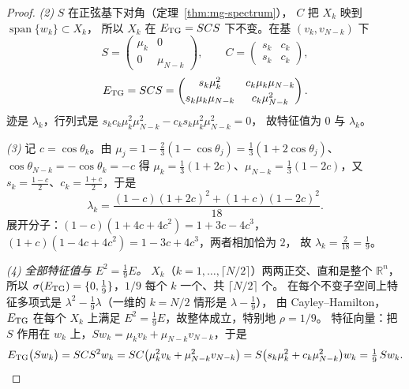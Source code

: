 \begin{proof}
\emph{(2)} $S$ 在正弦基下对角（定理~\ref{thm:mg-spectrum}），
$C$ 把 $X_k$ 映到 $\operatorname{span}\{w_k\}\subset X_k$，
所以 $X_k$ 在 $E_{\rm TG}=SCS$ 下不变。在基 $(v_k,v_{N-k})$ 下
\begin{equation}
  S=\begin{pmatrix}\mu_k&0\\0&\mu_{N-k}\end{pmatrix},\qquad
  C=\begin{pmatrix}s_k&c_k\\ s_k&c_k\end{pmatrix},
\end{equation}
\begin{equation}
  E_{\rm TG}=SCS=\begin{pmatrix}
    s_k\mu_k^2 & c_k\mu_k\mu_{N-k}\\[2pt]
    s_k\mu_k\mu_{N-k} & c_k\mu_{N-k}^2
  \end{pmatrix}.
\end{equation}
迹是 $\lambda_k$，行列式是 $s_kc_k\mu_k^2\mu_{N-k}^2-c_ks_k\mu_k^2\mu_{N-k}^2=0$，
故特征值为 $0$ 与 $\lambda_k$。

\emph{(3)} 记 $c=\cos\theta_k$。由 $\mu_j=1-\frac23(1-\cos\theta_j)=\frac13(1+2\cos\theta_j)$、
$\cos\theta_{N-k}=-\cos\theta_k=-c$ 得
$\mu_k=\frac13(1+2c)$、$\mu_{N-k}=\frac13(1-2c)$，又 $s_k=\frac{1-c}{2}$、$c_k=\frac{1+c}{2}$，于是
\begin{equation}
  \lambda_k=\frac{(1-c)(1+2c)^2+(1+c)(1-2c)^2}{18} .
\end{equation}
展开分子：$(1-c)(1+4c+4c^2)=1+3c-4c^3$，
$(1+c)(1-4c+4c^2)=1-3c+4c^3$，两者相加恰为 $2$，
故 $\lambda_k=\frac{2}{18}=\frac19$。

\emph{(4) 全部特征值与 $E^2=\frac19E$。}
$X_k$（$k=1,\dots,\lceil N/2\rceil$）两两正交、直和是整个 $\mathbb R^n$，
所以 $\sigma(E_{\rm TG})=\{0,\frac19\}$，$1/9$ 每个 $k$ 一个、共 $\lceil N/2\rceil$ 个。
在每个不变子空间上特征多项式是 $\lambda^2-\frac19\lambda$（一维的 $k=N/2$ 情形是 $\lambda-\frac19$），
由 Cayley--Hamilton，$E_{\rm TG}$ 在每个 $X_k$ 上满足 $E^2=\frac19E$，故整体成立，特别地 $\rho=1/9$。
特征向量：把 $S$ 作用在 $w_k$ 上，$Sw_k=\mu_kv_k+\mu_{N-k}v_{N-k}$，于是
\begin{equation}
  E_{\rm TG}\bigl(Sw_k\bigr)=SCS^2w_k=SC\bigl(\mu_k^2v_k+\mu_{N-k}^2v_{N-k}\bigr)
  =S\bigl(s_k\mu_k^2+c_k\mu_{N-k}^2\bigr)w_k=\tfrac19\,Sw_k .
\end{equation}
\end{proof}

